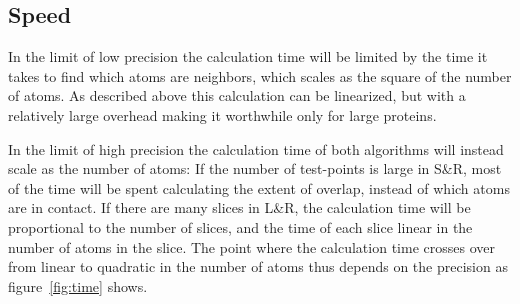 \documentclass[a4paper,11pt]{article}
\begin{document}
\begin{small}
\subsection{Speed}\label{sec:speed}

In the limit of low precision the calculation time will be limited by
the time it takes to find which atoms are neighbors, which scales as
the square of the number of atoms. As described above this calculation
can be linearized, but with a relatively large overhead making it
worthwhile only for large proteins.

In the limit of high precision the calculation time of both algorithms
will instead scale as the number of atoms: If the number of
test-points is large in S\&R, most of the time will be spent
calculating the extent of overlap, instead of which atoms are in
contact. If there are many slices in L\&R, the calculation time will
be proportional to the number of slices, and the time of each slice
linear in the number of atoms in the slice.  The point where the
calculation time crosses over from linear to quadratic in the number
of atoms thus depends on the precision as figure~\ref{fig:time} shows.


\end{small}
\end{document}
